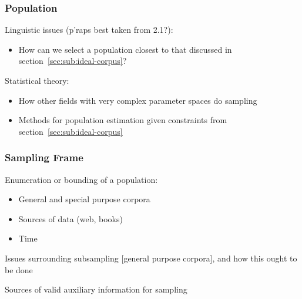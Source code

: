 \subsubsection{Population}
Linguistic issues (p'raps best taken from 2.1?):
\begin{itemize}
    \item How can we select a population closest to that discussed in section~\ref{sec:sub:ideal-corpus}?
\end{itemize}
Statistical theory:
\begin{itemize}
    \item How other fields with very complex parameter spaces do sampling
    \item Methods for population estimation given constraints from section~\ref{sec:sub:ideal-corpus}
\end{itemize}
\subsubsection{Sampling Frame}
Enumeration or bounding of a population:
\begin{itemize}
    \item General and special purpose corpora
    \item Sources of data (web, books)
    \item Time
\end{itemize}
Issues surrounding subsampling [general purpose corpora], and how this ought to be done

Sources of valid auxiliary information for sampling

